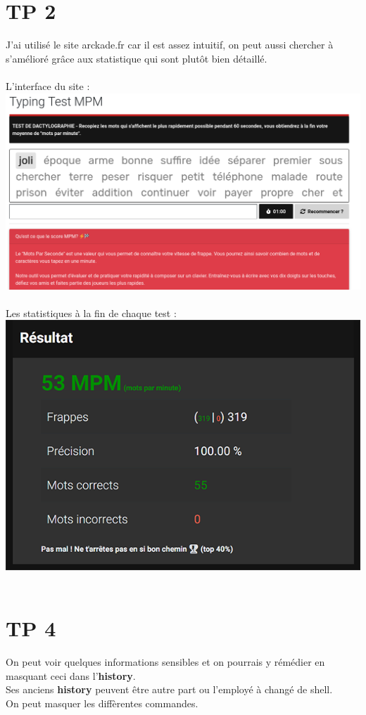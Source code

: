 \documentclass{report}
\begin{document}
\section{TP 2}
J'ai utilisé le site arckade.fr car il est assez intuitif, on peut aussi
chercher à s'amélioré grâce aux statistique qui sont plutôt bien détaillé.
\\
\\
L'interface du site :  
\includegraphics{arckade}
\\
\\
Les statistiques à la fin de chaque test : 
\includegraphics{stats} 
\\
\\
\section{TP 4}
On peut voir quelques informations sensibles et on pourrais y rémédier en 
masquant ceci dans l'\textbf{history}.
\\
Ses anciens \textbf{history} peuvent être autre part ou l'employé à 
changé de shell. 
\\
On peut masquer les diffèrentes commandes.
\\
\end{document}
